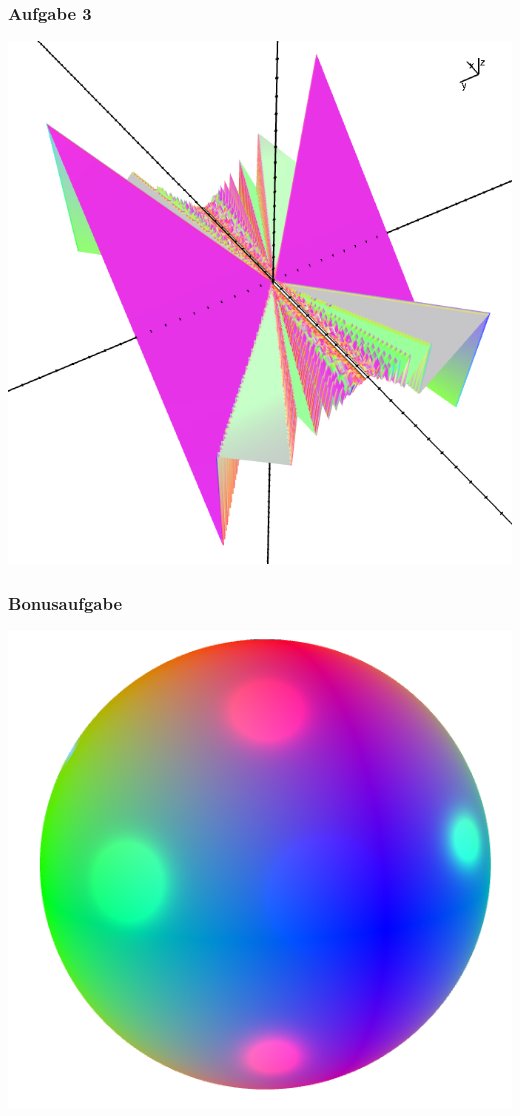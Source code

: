 \documentclass{beamer}
\begin{document}
\begin{frame}\frametitle{Aufgabe 3}
  \includegraphics[height=0.7\textheight]{images/graphs/x_mod_y.png}
\end{frame}
\begin{frame}\frametitle{Bonusaufgabe}
  \includegraphics[height=0.7\textheight]{images/graphs/sphere.png}
\end{frame}
\end{document}
